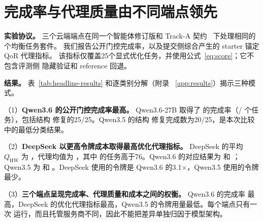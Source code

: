 \section{完成率与代理质量由不同端点领先}
\label{sec:evaluation}

\textbf{实验协议。} 三个云端端点在同一个智能体修订版和 Track-A
契约~\cite{fpt26tracka} 下处理相同的 \CorpusTaskCount{} 个均衡任务套件。
我们报告公开门控完成率，以及提交侧综合产生的 starter 锚定 QoR 代理指标。
该指标仅覆盖25个显式优化任务，并使用公式~\eqref{eq:score}；它不包含评测侧
隐藏验证和 reference 回退。

\begin{table}[!h]
  \centering
  \caption{\textbf{完成率与代理质量由不同端点领先。} QoR 代理指标为
  $100\,Q_{\mathrm{HW}}\,E$，使用25个优化任务的提交侧综合结果与 starter
  进行比较。}
  \label{tab:headline-results}
  \scriptsize
\end{table}

\textbf{结果。} 表~\ref{tab:headline-results} 和逐类别分解（附录
~\ref{app:results}）揭示三种模式。

（1）\textbf{Qwen3.6 的公开门控完成率最高。} Qwen3.6-27B 取得了
\QwenThreeSixSuccessRate{} 的完成率（\QwenThreeSixSuccessCount{}/
\CorpusTaskCount{} 个任务），包括结构 \CoSim{} 修复的25/25。Qwen3.5 的结构
修复完成数为20/25，是本次比较中的最低分类结果。

（2）\textbf{DeepSeek 以更高令牌成本取得最高优化代理指标。} DeepSeek 的平均
$Q_{\mathrm{HW}}$ 为 \DeepSeekQorQhw{}，代理均值为 \DeepSeekQorProxy{}，其中
\DeepSeekProxyAboveRate{} 的任务高于76。Qwen3.6 的对应结果为
\QwenThreeSixQorQhw{} 和 \QwenThreeSixQorProxy{}；Qwen3.5 为
\QwenThreeFiveQorQhw{} 和 \QwenThreeFiveQorProxy{}。DeepSeek 使用的令牌是
Qwen3.6 的3.1$\times$，Qwen3.5 使用的令牌最少。

（3）\textbf{三个端点呈现完成率、代理质量和成本之间的权衡。} Qwen3.6 的完成率
最高，DeepSeek 的优化代理指标最高，Qwen3.5 的令牌用量最低。每个端点只有一次
运行，而且托管服务商不同，因此不能把差异单独归因于模型架构。

